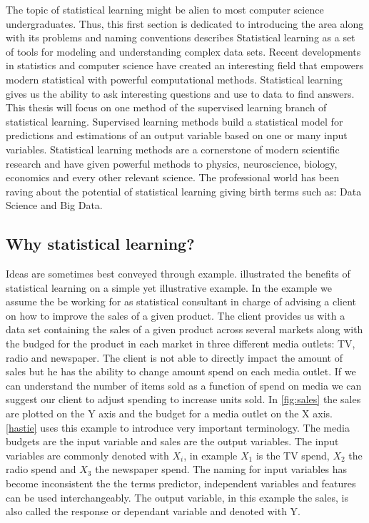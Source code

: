\documentclass{article}
\begin{document}
    The topic of statistical learning might be alien to most computer science undergraduates. Thus, this first section is dedicated to introducing the area along with its problems and naming conventions \cite{hastie} describes Statistical learning as a set of tools for modeling and understanding complex data sets. Recent developments in statistics and computer science have created an interesting field that empowers modern statistical  with powerful computational methods. Statistical learning gives us the ability to ask interesting questions and use to data to find answers. This thesis will focus on one method of the supervised learning branch of statistical learning. Supervised learning methods build a statistical model for predictions and estimations of an output variable based on one or many input variables. Statistical learning methods are a cornerstone of modern scientific research and have given powerful methods to physics, neuroscience, biology, economics and every other relevant science. The professional world has been raving about the potential of statistical learning giving birth terms such as: Data Science and Big Data.
    
        \subsection{Why statistical learning?}
    
    Ideas are sometimes best conveyed through example. \cite{hastie} illustrated the benefits of statistical learning on a simple yet illustrative example. In the example we assume the be working for as statistical consultant in charge of advising a client on how to improve the sales of a given product. The client provides us with a data set containing the sales of a given product across several markets along with the budged for the product in each market in three different media outlets: TV, radio and newspaper. The client is not able to directly impact the amount of sales but he has the ability to change amount spend on each media outlet. If we can understand the number of items sold as a function of spend on media we can suggest our client to adjust spending to increase units sold. In \ref{fig:sales} the sales are plotted on the Y axis and the budget for a media outlet on the X axis. \ref{hastie} uses this example to introduce very important terminology. The media budgets are the input variable and sales are the output variables. The input variables are commonly denoted with $X_i$, in example $X_1$ is the TV spend, $X_2$ the radio spend and $X_3$ the newspaper spend. The naming for input variables has become inconsistent the the terms predictor, independent variables and features can be used interchangeably. The output variable, in this example the sales, is also called the response or dependant variable and denoted with Y.
    
\end{document}
